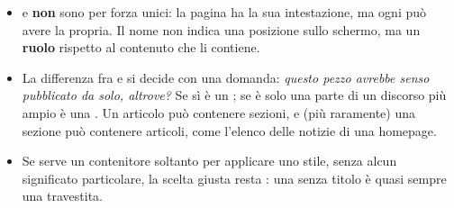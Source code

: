 \begin{itemize}
  \item {} e  \textbf{non} sono per forza unici: la pagina ha
        la sua intestazione, ma ogni  può avere la propria. Il nome
        non indica una posizione sullo schermo, ma un \textbf{ruolo} rispetto al
        contenuto che li contiene.
  \item La differenza fra  e  si decide con una domanda:
        \textit{questo pezzo avrebbe senso pubblicato da solo, altrove?} Se sì è
        un ; se è solo una parte di un discorso più ampio è una
        . Un articolo può contenere sezioni, e (più raramente) una
        sezione può contenere articoli, come l'elenco delle notizie di una
        homepage.
  \item Se serve un contenitore soltanto per applicare uno stile, senza alcun
        significato particolare, la scelta giusta resta : una
         senza titolo è quasi sempre una  travestita.
\end{itemize}

